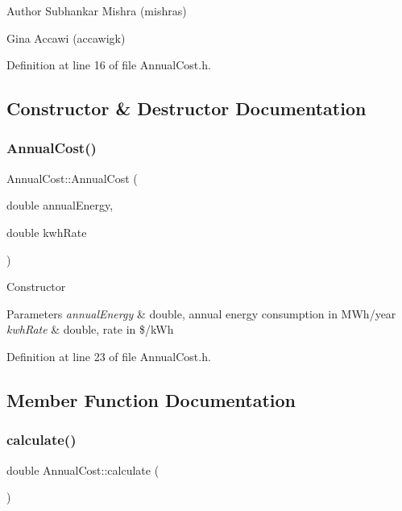 \begin{DoxyAuthor}{Author}
Subhankar Mishra (mishras) 

Gina Accawi (accawigk) 
\end{DoxyAuthor}


Definition at line 16 of file Annual\+Cost.\+h.



\subsection{Constructor \& Destructor Documentation}
\mbox{\label{class_annual_cost_a723513a7074d1799e2bf410b60b3146f}} 
\subsubsection{\texorpdfstring{Annual\+Cost()}{AnnualCost()}}
{\footnotesize\ttfamily Annual\+Cost\+::\+Annual\+Cost (\begin{DoxyParamCaption}\item[{double}]{annual\+Energy,  }\item[{double}]{kwh\+Rate }\end{DoxyParamCaption})\hspace{0.3cm}{\ttfamily [inline]}}

Constructor 
\begin{DoxyParams}{Parameters}
{\em annual\+Energy} & double, annual energy consumption in M\+Wh/year \\
\hline
{\em kwh\+Rate} & double, rate in \$/k\+Wh \\
\hline
\end{DoxyParams}


Definition at line 23 of file Annual\+Cost.\+h.



\subsection{Member Function Documentation}
\mbox{\label{class_annual_cost_adb12b66af50d01746c3f6f0d430b1fdd}} 
\subsubsection{\texorpdfstring{calculate()}{calculate()}}
{\footnotesize\ttfamily double Annual\+Cost\+::calculate (\begin{DoxyParamCaption}{ }\end{DoxyParamCaption})}



